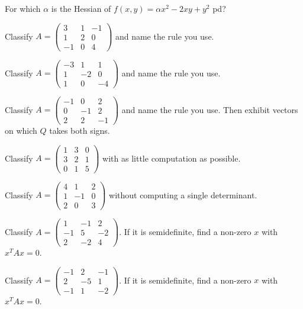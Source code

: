 \begin{problems}
    \item For which $\alpha$ is the Hessian of $f(x, y) = \alpha x^{2} - 2 x y + y^{2}$ pd?
    \item Classify $A = \begin{pmatrix} 3 & 1 & -1 \\ 1 & 2 & 0 \\ -1 & 0 & 4 \end{pmatrix}$ and name the rule you use.
    \item Classify $A = \begin{pmatrix} -3 & 1 & 1 \\ 1 & -2 & 0 \\ 1 & 0 & -4 \end{pmatrix}$ and name the rule you use.
    \item Classify $A = \begin{pmatrix} -1 & 0 & 2 \\ 0 & -1 & 2 \\ 2 & 2 & -1 \end{pmatrix}$ and name the rule you use. Then exhibit vectors on which $Q$ takes both signs.
    \item Classify $A = \begin{pmatrix} 1 & 3 & 0 \\ 3 & 2 & 1 \\ 0 & 1 & 5 \end{pmatrix}$ with as little computation as possible.
    \item Classify $A = \begin{pmatrix} 4 & 1 & 2 \\ 1 & -1 & 0 \\ 2 & 0 & 3 \end{pmatrix}$ without computing a single determinant.
    \item Classify $A = \begin{pmatrix} 1 & -1 & 2 \\ -1 & 5 & -2 \\ 2 & -2 & 4 \end{pmatrix}$. If it is semidefinite, find a non-zero $x$ with $x^{T} A x = 0$.
    \item Classify $A = \begin{pmatrix} -1 & 2 & -1 \\ 2 & -5 & 1 \\ -1 & 1 & -2 \end{pmatrix}$. If it is semidefinite, find a non-zero $x$ with $x^{T} A x = 0$.
\end{problems}

